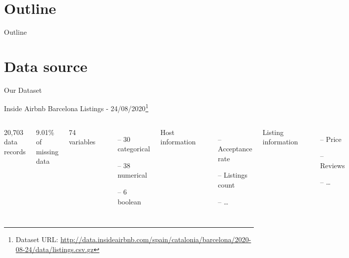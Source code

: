 \section{Outline}
\begin{frame}{Outline}
\begin{scriptsize}
    \vspace{1.5em}
    \tableofcontents
\end{scriptsize}
\end{frame}

\section{Data source}
\begin{frame}{Our Dataset}
\begin{center}
    Inside Airbnb Barcelona Listings - 24/08/2020\footnote[frame]{Dataset URL: \url{http://data.insideairbnb.com/spain/catalonia/barcelona/2020-08-24/data/listings.csv.gz}}
\vspace{5 mm}

\begin{columns}[t]
    20,703 data records
    
    9.01\% of missing data
    
    74 variables
    \small
    \begin{itemize}[topsep=0pt]
        \itemsep-0.25em
    	\item[--] 30 categorical
    	\item[--] 38 numerical
    	\item[--] 6 boolean
    \end{itemize}
    \normalsize
    
    Host information
    \small
    \begin{itemize}[topsep=0pt]
        \itemsep-0.5em
    	\item[--] Acceptance rate
    	\item[--] Listings count
    	\item[--] \dots
    \end{itemize}
    \normalsize
    Listing information
    \small
    \begin{itemize}[topsep=0pt]
        \itemsep-0.5em
    	\item[--] Price
    	\item[--] Reviews
    	\item[--] \dots
    \end{itemize}
    \normalsize
\end{columns}

\end{center}
\end{frame}


